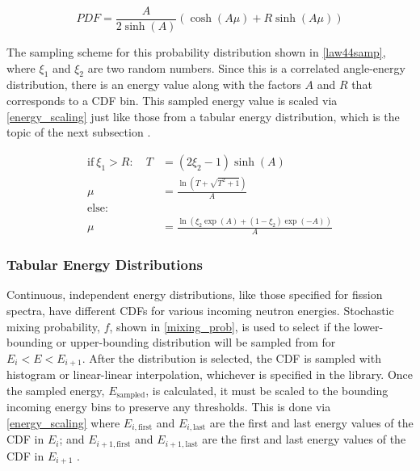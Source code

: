 \begin{equation}
\label{law44}
PDF = \frac{A}{2 \sinh (A)} ( \cosh(A\mu)+R \sinh (A\mu))
\end{equation}

The sampling scheme for this probability distribution shown in \eqref{law44samp}, where $\xi_1$ and $\xi_2$ are two random numbers.  Since this is a correlated angle-energy distribution, there is an energy value along with the factors $A$ and $R$ that corresponds to a CDF bin.  This sampled energy value is scaled via \eqref{energy_scaling} just like those from a tabular energy distribution, which is the topic of the next subsection \cite{3rdsampler}\cite{openmc}.

\begin{equation}
\label{law44samp}
\begin{split}
\mathrm{if} \: \xi_1 > R:  \quad T&=(2\xi_2-1)\sinh(A)\\
\mu &= \frac{\ln(T+\sqrt{T^2+1})}{A}\\
\mathrm{else: }  \qquad & \\
\mu &= \frac{ \ln(\xi_2 \exp(A) + (1-\xi_2)\exp(-A))}{A}
\end{split}
\end{equation}

\subsubsection{Tabular Energy Distributions}

Continuous, independent energy distributions, like those specified for fission spectra, have different CDFs for various incoming neutron energies.  Stochastic mixing probability, $f$, shown in \eqref{mixing_prob}, is used to select if the lower-bounding or upper-bounding distribution will be sampled from for $E_i < E < E_{i+1}$.  After the distribution is selected, the CDF is sampled with histogram or linear-linear interpolation, whichever is specified in the library.  Once the sampled energy, $E_\mathrm{sampled}$, is calculated, it must be scaled to the bounding incoming energy bins to preserve any thresholds.  This is done via \eqref{energy_scaling} where $E_{i,\mathrm{first}}$ and $E_{i,\mathrm{last}}$ are the first and last energy values of the CDF in $E_i$; and $E_{i+1,\mathrm{first}}$ and $E_{i+1,\mathrm{last}}$ are the first and last energy values of the CDF in $E_{i+1}$ \cite{mcnp}.

